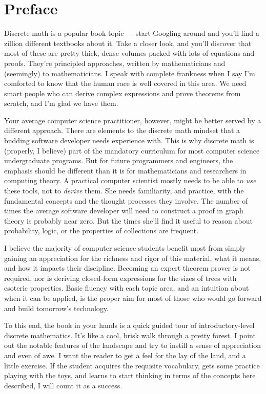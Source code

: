  
\chapter{Preface}
Discrete math is a popular book topic --- start Googling around and you'll
find a zillion different textbooks about it. Take a closer look, and you'll
discover that most of these are pretty thick, dense volumes packed with
lots of equations and proofs. They're principled approaches, written by
mathematicians and (seemingly) to mathematicians. I speak with complete
frankness when I say I'm comforted to know that the human race is well
covered in this area. We need smart people who can derive complex
expressions and prove theorems from scratch, and I'm glad we have them.

Your average computer science practitioner, however, might be better served
by a different approach. There are elements to the discrete math mindset
that a budding software developer needs experience with. This is why
discrete math is (properly, I believe) part of the mandatory curriculum for
most computer science undergraduate programs. But for future programmers
and engineers, the emphasis should be different than it is for
mathematicians and researchers in computing theory. A practical computer
scientist mostly needs to be able to \textit{use} these tools, not to
\textit{derive} them. She needs familiarity, and practice, with the
fundamental concepts and the thought processes they involve. The number of
times the average software developer will need to construct a proof in
graph theory is probably near zero. But the times she'll find it useful to
reason about probability, logic, or the properties of collections are
frequent.

I believe the majority of computer science students benefit most from
simply gaining an appreciation for the richness and rigor of this material,
what it means, and how it impacts their discipline. Becoming an expert
theorem prover is not required, nor is deriving closed-form expressions for
the sizes of trees with esoteric properties. Basic fluency with each topic
area, and an intuition about when it can be applied, is the proper aim for
most of those who would go forward and build tomorrow's technology.

To this end, the book in your hands is a quick guided tour of
introductory-level discrete mathematics. It's like a cool, brisk walk
through a pretty forest. I point out the notable features of the landscape
and try to instill a sense of appreciation and even of awe. I want the
reader to get a feel for the lay of the land, and a little exercise. If the
student acquires the requisite vocabulary, gets some practice playing
with the toys, and learns to start thinking in terms of the concepts here
described, I will count it as a success.
